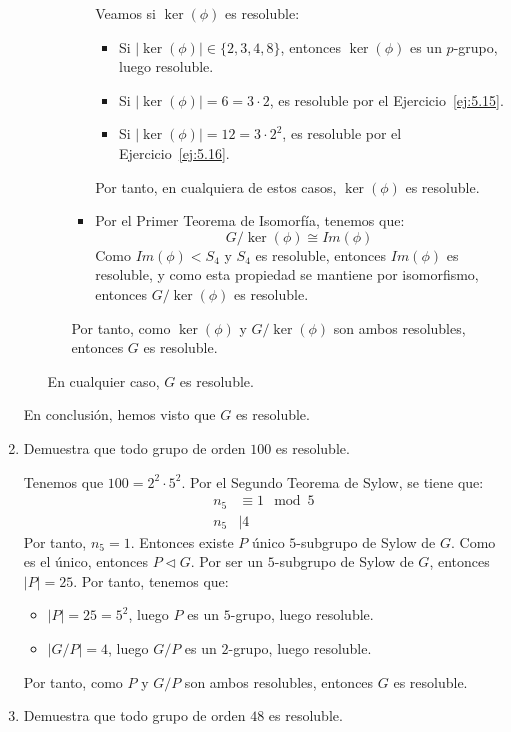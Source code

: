 \begin{ejercicio}
\begin{enumerate}
\begin{itemize}
\begin{itemize}
\begin{itemize}
                    Veamos si $\ker(\phi)$ es resoluble:
                    \begin{itemize}
                        \item Si $|\ker(\phi)|\in \{2,3,4,8\}$, entonces $\ker(\phi)$ es un $p$-grupo, luego resoluble.
                        \item Si $|\ker(\phi)|=6=3\cdot 2$, es resoluble por el Ejercicio~\ref{ej:5.15}.
                        \item Si $|\ker(\phi)|=12=3\cdot 2^2$, es resoluble por el Ejercicio~\ref{ej:5.16}.
                    \end{itemize}
                    Por tanto, en cualquiera de estos casos, $\ker(\phi)$ es resoluble.

                    \item Por el Primer Teorema de Isomorfía, tenemos que:
                    \begin{equation*}
                        G/\ker(\phi) \cong Im(\phi)
                    \end{equation*}
                    Como $Im(\phi)<S_4$ y $S_4$ es resoluble, entonces $Im(\phi)$ es resoluble, y como esta propiedad se mantiene por isomorfismo, entonces $G/\ker(\phi)$ es resoluble.
                \end{itemize}
                Por tanto, como $\ker(\phi)$ y $G/\ker(\phi)$ son ambos resolubles, entonces $G$ es resoluble.
            \end{itemize}

            En cualquier caso, $G$ es resoluble.
        \end{itemize}

        En conclusión, hemos visto que $G$ es resoluble.
        \item Demuestra que todo grupo de orden $100$ es resoluble.
        
        Tenemos que $100=2^2\cdot 5^2$. Por el Segundo Teorema de Sylow, se tiene que:
        \begin{align*}
            n_5 &\equiv 1 \mod 5 \\
            n_5 &\mid 4
        \end{align*}
        Por tanto, $n_5=1$. Entonces existe $P$ único $5$-subgrupo de Sylow de $G$. Como es el único, entonces $P\lhd G$. Por ser un $5$-subgrupo de Sylow de $G$, entonces $|P|=25$. Por tanto, tenemos que:
        \begin{itemize}
            \item $|P|=25=5^2$, luego $P$ es un $5$-grupo, luego resoluble.
            \item $|G/P|=4$, luego $G/P$ es un $2$-grupo, luego resoluble.
        \end{itemize}
        Por tanto, como $P$ y $G/P$ son ambos resolubles, entonces $G$ es resoluble.
        \item Demuestra que todo grupo de orden $48$ es resoluble.
        

\end{enumerate}
\end{ejercicio}
